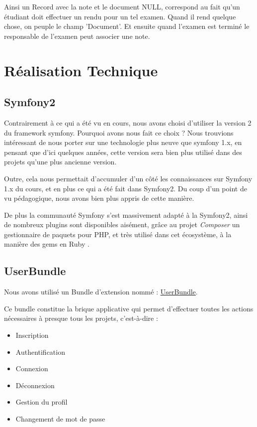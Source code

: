 \documentclass{report}
\begin{document}
			Ainsi un Record avec la note et le document NULL, correspond au fait qu'un
      étudiant doit effectuer un rendu pour un tel examen. Quand il rend quelque
      chose, on peuple le champ 'Document'. Et ensuite quand l'examen est terminé
      le responsable de l'examen peut associer une note.

  \clearpage
  \section{Réalisation Technique}
    \subsection{Symfony2}
      Contrairement à ce qui a été vu en cours, nous avons choisi d'utiliser la 
      version 2 du framework symfony. Pourquoi avons nous fait ce choix ? Nous 
      trouvions intéressant de nous porter sur une technologie plus neuve que 
      symfony 1.x, en pensant que d'ici quelques années, cette version sera bien
      plus utilisé dans des projets qu'une plus ancienne version.
      
      Outre, cela nous permettait d'accumuler d'un côté les connaissances sur
      Symfony 1.x du cours, et en plus ce qui a été fait dans Symfony2. Du coup
      d'un point de vu pédagogique, nous avons bien plus appris de cette manière.
      
      De plus la communauté Symfony s'est massivement adapté à la Symfony2, ainsi
      de nombreux plugins sont disponibles aisément, grâce au projet \textsl{Composer}
      un gestionnaire de paquets pour PHP, et très utilisé dans cet écosystème,
      à la manière des gems en Ruby
      .
      
    \subsection{UserBundle}
      Nous avons utilisé un Bundle d'extension nommé : 
      \href{https://github.com/FriendsOfSymfony/FOSUserBundle}{UserBundle}.
      
      Ce bundle constitue la brique applicative qui permet d'effectuer toutes
      les actions nécessaires à presque tous les projets, c'est-à-dire :
      \begin{itemize}
        \item{Inscription}
        \item{Authentification}
        \item{Connexion}
        \item{Déconnexion}
        \item{Gestion du profil}
        \item{Changement de mot de passe}
      \end{itemize}\vspace{1em}
\end{document}
